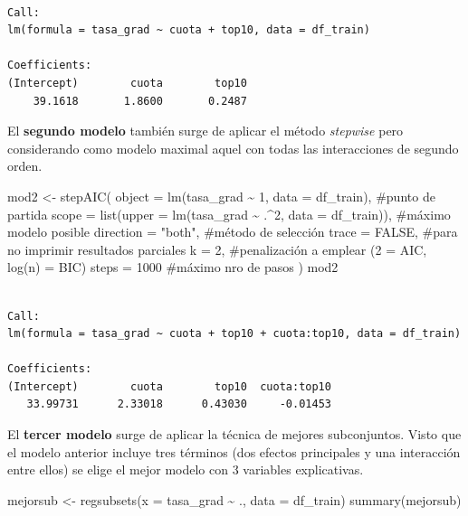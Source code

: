 \documentclass[
  letterpaper,
  DIV=11,
  numbers=noendperiod]{scrartcl}
\newenvironment{Shaded}{\begin{snugshade}}{\end{snugshade}}
\newcommand{\AttributeTok}[1]{\textcolor[rgb]{0.40,0.45,0.13}{#1}}
\newcommand{\CommentTok}[1]{\textcolor[rgb]{0.37,0.37,0.37}{#1}}
\newcommand{\ConstantTok}[1]{\textcolor[rgb]{0.56,0.35,0.01}{#1}}
\newcommand{\DecValTok}[1]{\textcolor[rgb]{0.68,0.00,0.00}{#1}}
\newcommand{\FunctionTok}[1]{\textcolor[rgb]{0.28,0.35,0.67}{#1}}
\newcommand{\NormalTok}[1]{\textcolor[rgb]{0.00,0.23,0.31}{#1}}
\newcommand{\OtherTok}[1]{\textcolor[rgb]{0.00,0.23,0.31}{#1}}
\newcommand{\SpecialCharTok}[1]{\textcolor[rgb]{0.37,0.37,0.37}{#1}}
\newcommand{\StringTok}[1]{\textcolor[rgb]{0.13,0.47,0.30}{#1}}
\begin{document}
\begin{verbatim}

Call:
lm(formula = tasa_grad ~ cuota + top10, data = df_train)

Coefficients:
(Intercept)        cuota        top10  
    39.1618       1.8600       0.2487  
\end{verbatim}

El \textbf{segundo modelo} también surge de aplicar el método
\emph{stepwise} pero considerando como modelo maximal aquel con todas
las interacciones de segundo orden.

\begin{Shaded}
\begin{Highlighting}[]
\NormalTok{mod2 }\OtherTok{\textless{}{-}} \FunctionTok{stepAIC}\NormalTok{(}
  \AttributeTok{object =} \FunctionTok{lm}\NormalTok{(tasa\_grad }\SpecialCharTok{\textasciitilde{}} \DecValTok{1}\NormalTok{, }\AttributeTok{data =}\NormalTok{ df\_train), }\CommentTok{\#punto de partida}
  \AttributeTok{scope =} \FunctionTok{list}\NormalTok{(}\AttributeTok{upper =} \FunctionTok{lm}\NormalTok{(tasa\_grad }\SpecialCharTok{\textasciitilde{}}\NormalTok{ .}\SpecialCharTok{\^{}}\DecValTok{2}\NormalTok{, }\AttributeTok{data =}\NormalTok{ df\_train)), }\CommentTok{\#máximo modelo posible}
  \AttributeTok{direction =} \StringTok{"both"}\NormalTok{, }\CommentTok{\#método de selección}
  \AttributeTok{trace =} \ConstantTok{FALSE}\NormalTok{, }\CommentTok{\#para no imprimir resultados parciales}
  \AttributeTok{k =} \DecValTok{2}\NormalTok{, }\CommentTok{\#penalización a emplear (2 = AIC, log(n) = BIC)}
  \AttributeTok{steps =} \DecValTok{1000} \CommentTok{\#máximo nro de pasos}
\NormalTok{)}
\NormalTok{mod2}
\end{Highlighting}
\end{Shaded}

\begin{verbatim}

Call:
lm(formula = tasa_grad ~ cuota + top10 + cuota:top10, data = df_train)

Coefficients:
(Intercept)        cuota        top10  cuota:top10  
   33.99731      2.33018      0.43030     -0.01453  
\end{verbatim}

El \textbf{tercer modelo} surge de aplicar la técnica de mejores
subconjuntos. Visto que el modelo anterior incluye tres términos (dos
efectos principales y una interacción entre ellos) se elige el mejor
modelo con 3 variables explicativas.

\begin{Shaded}
\begin{Highlighting}[]
\NormalTok{mejorsub }\OtherTok{\textless{}{-}} \FunctionTok{regsubsets}\NormalTok{(}\AttributeTok{x =}\NormalTok{ tasa\_grad }\SpecialCharTok{\textasciitilde{}}\NormalTok{ ., }\AttributeTok{data =}\NormalTok{ df\_train)}
\FunctionTok{summary}\NormalTok{(mejorsub)}
\end{Highlighting}
\end{Shaded}
\end{document}
